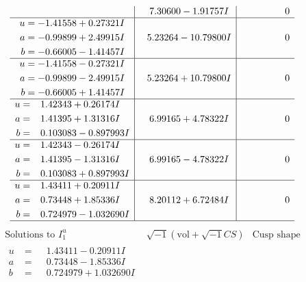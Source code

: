 \documentclass[1p]{elsarticle_modified}
\theoremstyle{definition}
\newcommand{\I}{\sqrt{-1}}
\begin{document}
$$\begin{array}{c|c|c}
 & \phantom{-}7.30600 - 1.91757 I & \phantom{-0.000000 } 0 \\ \hline\begin{aligned}
u &= -1.41558 + 0.27321 I \\
a &= -0.99899 + 2.49915 I \\
b &= -0.66005 - 1.41457 I\end{aligned}
 & \phantom{-}5.23264 - 10.79800 I & \phantom{-0.000000 } 0 \\ \hline\begin{aligned}
u &= -1.41558 - 0.27321 I \\
a &= -0.99899 - 2.49915 I \\
b &= -0.66005 + 1.41457 I\end{aligned}
 & \phantom{-}5.23264 + 10.79800 I & \phantom{-0.000000 } 0 \\ \hline\begin{aligned}
u &= \phantom{-}1.42343 + 0.26174 I \\
a &= \phantom{-}1.41395 + 1.31316 I \\
b &= \phantom{-}0.103083 - 0.897993 I\end{aligned}
 & \phantom{-}6.99165 + 4.78322 I & \phantom{-0.000000 } 0 \\ \hline\begin{aligned}
u &= \phantom{-}1.42343 - 0.26174 I \\
a &= \phantom{-}1.41395 - 1.31316 I \\
b &= \phantom{-}0.103083 + 0.897993 I\end{aligned}
 & \phantom{-}6.99165 - 4.78322 I & \phantom{-0.000000 } 0 \\ \hline\begin{aligned}
u &= \phantom{-}1.43411 + 0.20911 I \\
a &= \phantom{-}0.73448 + 1.85336 I \\
b &= \phantom{-}0.724979 - 1.032690 I\end{aligned}
 & \phantom{-}8.20112 + 6.72484 I & \phantom{-0.000000 } 0\\
 \hline 
 \end{array}$$\newpage$$\begin{array}{c|c|c}  
\text{Solutions to }I^u_{1}& \I (\text{vol} + \sqrt{-1}CS) & \text{Cusp shape}\\
 \hline 
\begin{aligned}
u &= \phantom{-}1.43411 - 0.20911 I \\
a &= \phantom{-}0.73448 - 1.85336 I \\
b &= \phantom{-}0.724979 + 1.032690 I\end{aligned}

\end{array}$$
\end{document}
